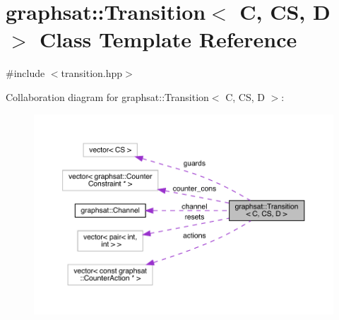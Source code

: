 \hypertarget{classgraphsat_1_1_transition}{}\section{graphsat\+::Transition$<$ C, CS, D $>$ Class Template Reference}
\label{classgraphsat_1_1_transition}


{\ttfamily \#include $<$transition.\+hpp$>$}



Collaboration diagram for graphsat\+::Transition$<$ C, CS, D $>$\+:
\nopagebreak
\begin{figure}[H]
\begin{center}
\leavevmode
\includegraphics[width=350pt]{classgraphsat_1_1_transition__coll__graph}
\end{center}
\end{figure}
